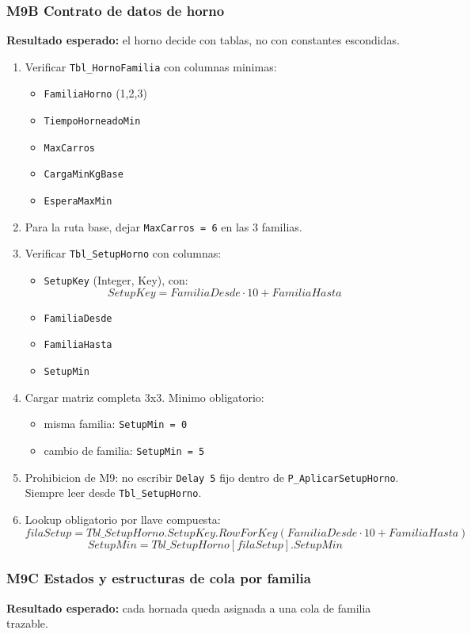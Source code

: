 \documentclass[11pt]{article}
\newcommand{\simio}[1]{\texttt{#1}}
\newcommand{\tabla}[1]{\texttt{#1}}
\newcommand{\state}[1]{\texttt{#1}}
\newcommand{\proc}[1]{\texttt{#1}}
\begin{document}
\subsubsection{M9B Contrato de datos de horno}
\textbf{Resultado esperado:} el horno decide con tablas, no con constantes escondidas.

\begin{enumerate}
  \item Verificar \tabla{Tbl\_HornoFamilia} con columnas minimas:
  \begin{itemize}
    \item \state{FamiliaHorno} (1,2,3)
    \item \state{TiempoHorneadoMin}
    \item \state{MaxCarros}
    \item \state{CargaMinKgBase}
    \item \state{EsperaMaxMin}
  \end{itemize}
  \item Para la ruta base, dejar \state{MaxCarros = 6} en las 3 familias.
  \item Verificar \tabla{Tbl\_SetupHorno} con columnas:
  \begin{itemize}
    \item \state{SetupKey} (Integer, Key), con:
    \[
    SetupKey = FamiliaDesde \cdot 10 + FamiliaHasta
    \]
    \item \state{FamiliaDesde}
    \item \state{FamiliaHasta}
    \item \state{SetupMin}
  \end{itemize}
  \item Cargar matriz completa 3x3. Minimo obligatorio:
  \begin{itemize}
    \item misma familia: \state{SetupMin = 0}
    \item cambio de familia: \state{SetupMin = 5}
  \end{itemize}
  \item Prohibicion de M9: no escribir \simio{Delay 5} fijo dentro de \proc{P\_AplicarSetupHorno}. Siempre leer desde \tabla{Tbl\_SetupHorno}.
  \item Lookup obligatorio por llave compuesta:
  \[
  filaSetup = Tbl\_SetupHorno.SetupKey.RowForKey(FamiliaDesde \cdot 10 + FamiliaHasta)
  \]
  \[
  SetupMin = Tbl\_SetupHorno[filaSetup].SetupMin
  \]
\end{enumerate}

\subsubsection{M9C Estados y estructuras de cola por familia}
\textbf{Resultado esperado:} cada hornada queda asignada a una cola de familia trazable.
\end{document}
